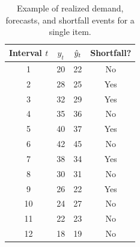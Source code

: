 \begin{table}[h!]
\centering
\begin{tabular}{c c c c}
\hline
Interval $t$ & $y_t$ & $\hat{y}_t$ & Shortfall? \\
\hline
1  & 20 & 22 & No \\
2  & 28 & 25 & Yes \\
3  & 32 & 29 & Yes \\
4  & 35 & 36 & No \\
5  & 40 & 37 & Yes \\
6  & 42 & 45 & No \\
7  & 38 & 34 & Yes \\
8  & 30 & 31 & No \\
9  & 26 & 22 & Yes \\
10 & 24 & 27 & No \\
11 & 22 & 23 & No \\
12 & 18 & 19 & No \\
\hline
\end{tabular}
\caption{Example of realized demand, forecasts, and shortfall events for a single item.}
\label{tab:nsl_example}
\end{table}
